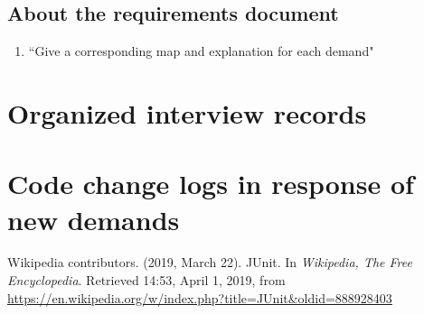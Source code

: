 \documentclass[a4paper]{report}
\begin{document}
\subsection{About the requirements document }
\begin{enumerate}
\item ``Give a corresponding map and explanation for each demand"
\end{enumerate}
\section{Organized interview records}
\section{Code change logs in response of new demands}




\begin{thebibliography}{A}


Wikipedia contributors. (2019, March 22). JUnit. In \emph{Wikipedia, The Free Encyclopedia}. Retrieved 14:53, April 1, 2019, from \url{https://en.wikipedia.org/w/index.php?title=JUnit&oldid=888928403}
\end{thebibliography}
\end{document}
